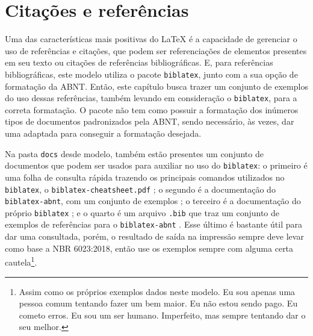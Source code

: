 \chapter{Citações e referências}\label{capitulo:referencias}
Uma das características mais positivas do \LaTeX{} é a capacidade de gerenciar o uso de referências e citações, que podem ser referenciações de elementos presentes em seu texto ou citações de referências bibliográficas. E, para referências bibliográficas\footnotemark, este modelo utiliza o pacote \verb|biblatex|, junto com a sua opção de formatação da ABNT. Então, este capítulo busca trazer um conjunto de exemplos do uso dessas referências, também levando em consideração o \verb|biblatex|, para a correta formatação. O pacote não tem como possuir a formatação dos inúmeros tipos de documentos padronizados pela ABNT, sendo necessário, às vezes, dar uma adaptada para conseguir a formatação desejada.

  Na pasta \texttt{docs} desde modelo, também estão presentes um conjunto de documentos que podem ser usados para auxiliar no uso do \texttt{biblatex}: o primeiro é uma folha de consulta rápida trazendo os principais comandos utilizados no \texttt{biblatex}, o \texttt{biblatex-cheatsheet.pdf} \cite{pdf:biblatex-cheatsheet}; o segundo é a documentação do \texttt{biblatex-abnt}, com um conjunto de exemplos \cite{pdf:biblatex-abnt}; o terceiro é a documentação do próprio \texttt{biblatex} \cite{pdf:biblatex}; e o quarto é um arquivo \texttt{.bib} que traz um conjunto de exemplos de referências para o \texttt{biblatex-abnt} \cite{bib:biblatex-abnt}. Esse último é bastante útil para dar uma consultada, porém, o resultado de saída na impressão sempre deve levar como base a NBR 6023:2018, então use os exemplos sempre com alguma certa cautela\footnote{Assim como os próprios exemplos dados neste modelo. Eu sou apenas uma pessoa comum tentando fazer um bem maior. Eu não estou sendo pago. Eu cometo erros. Eu sou um ser humano. Imperfeito, mas sempre tentando dar o seu melhor.}.


